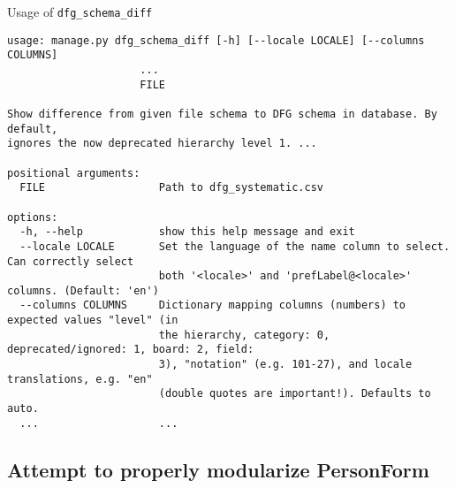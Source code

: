 \begin{frame}[fragile]{Usage of \texttt{dfg\_schema\_diff}}
    \scriptsize
\begin{verbatim}
usage: manage.py dfg_schema_diff [-h] [--locale LOCALE] [--columns COLUMNS]
                     ...
                     FILE

Show difference from given file schema to DFG schema in database. By default,
ignores the now deprecated hierarchy level 1. ...

positional arguments:
  FILE                  Path to dfg_systematic.csv

options:
  -h, --help            show this help message and exit
  --locale LOCALE       Set the language of the name column to select. Can correctly select
                        both '<locale>' and 'prefLabel@<locale>' columns. (Default: 'en')
  --columns COLUMNS     Dictionary mapping columns (numbers) to expected values "level" (in
                        the hierarchy, category: 0, deprecated/ignored: 1, board: 2, field:
                        3), "notation" (e.g. 101-27), and locale translations, e.g. "en"
                        (double quotes are important!). Defaults to auto.
  ...                   ...
\end{verbatim}
\end{frame}

% 

% 


\subsection{Attempt to properly modularize PersonForm}

